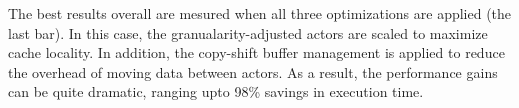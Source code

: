 The best results overall are mesured when all three optimizations are
applied (the last bar). In this case, the granualarity-adjusted actors
are scaled to maximize cache locality. In addition, the copy-shift
buffer management is applied to reduce the overhead of moving data
between actors. As a result, the performance gains can be quite
dramatic, ranging upto 98\% savings in execution time.

